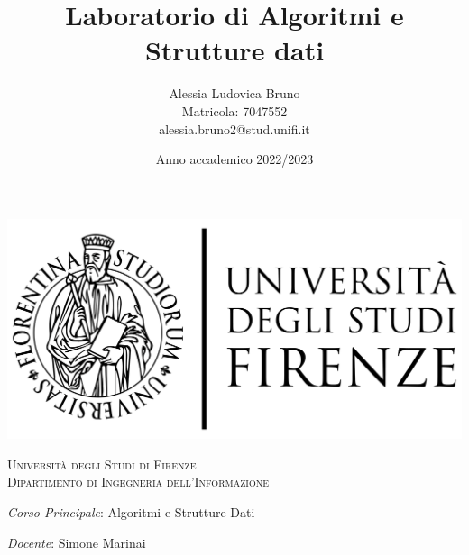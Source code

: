\documentclass{article}
\title{Laboratorio di Algoritmi e Strutture dati}
\author{Alessia Ludovica Bruno\\ Matricola: 7047552  \\ alessia.bruno2@stud.unifi.it}
\date{Anno accademico 2022/2023}
\begin{document}
\maketitle

\thispagestyle{plain}

\begin{center}

    \includegraphics[scale=0.05]{Images/unifi.png}
    
    \vspace{0.8cm}
    
    \textsc{\LARGE Università degli Studi di Firenze}\\[0.5cm]
    \textsc{\Large Dipartimento di Ingegneria dell'Informazione}\\[0.5cm]
    
    \vspace{0.8cm}
    
    \textit{Corso Principale}: Algoritmi e Strutture Dati
    
    \textit{Docente}: Simone Marinai
    
    \vspace{0.8cm}
    
\end{center}

\pagebreak

\pagestyle{fancy} 
\lhead{}
\chead{}
\cfoot{}
\rfoot{\thepage}
\renewcommand{\headrulewidth}{0.4pt}
\renewcommand{\footrulewidth}{0.4pt}



\tableofcontents
\listoffigures

\newpage


\newpage


\newpage

\end{document}
